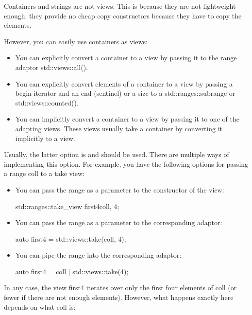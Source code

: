 
Containers and strings are not views. This is because they are not lightweight enough: they provide no cheap copy constructors because they have to copy the elements.

However, you can easily use containers as views:

\begin{itemize}
\item
You can explicitly convert a container to a view by passing it to the range adaptor std::views::all().

\item
You can explicitly convert elements of a container to a view by passing a begin iterator and an end (sentinel) or a size to a std::ranges::subrange or std::views::counted().

\item
You can implicitly convert a container to a view by passing it to one of the adapting views. These views usually take a container by converting it implicitly to a view.
\end{itemize}

Usually, the latter option is and should be used. There are multiple ways of implementing this option. For example, you have the following options for passing a range coll to a take view:

\begin{itemize}
\item
You can pass the range as a parameter to the constructor of the view:

\begin{cpp}
std::ranges::take_view first4{coll, 4};
\end{cpp}

\item
You can pass the range as a parameter to the corresponding adaptor:

\begin{cpp}
auto first4 = std::views::take(coll, 4);
\end{cpp}

\item
You can pipe the range into the corresponding adaptor:

\begin{cpp}
auto first4 = coll | std::views::take(4);
\end{cpp}
\end{itemize}

In any case, the view first4 iterates over only the first four elements of coll (or fewer if there are not enough elements). However, what happens exactly here depends on what coll is:

